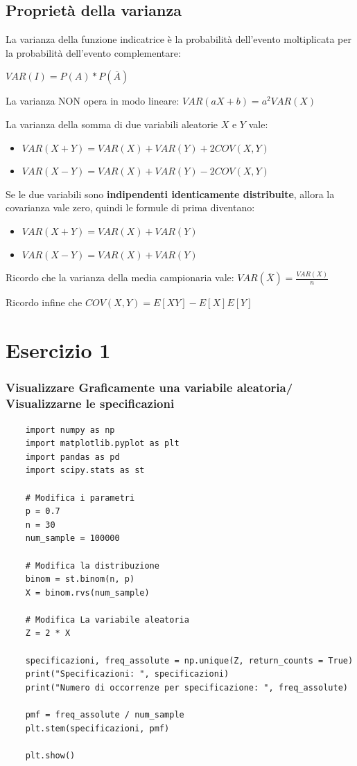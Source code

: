 \documentclass{article}
\begin{document}
\subsection*{Proprietà della varianza}

La varianza della funzione indicatrice è la probabilità dell'evento moltiplicata per la probabilità dell'evento complementare:

$VAR(I) = P(A) * P(\overline{A})$

La varianza NON opera in modo lineare: $VAR(aX + b) = a^2 VAR(X)$

La varianza della somma di due variabili aleatorie $X$ e $Y$ vale:

\begin{itemize}
    \item $VAR(X + Y) = VAR(X) + VAR(Y) + 2COV(X,Y)$
    \item $VAR(X - Y) = VAR(X) + VAR(Y) - 2COV(X,Y)$
\end{itemize}

Se le due variabili sono \textbf{indipendenti identicamente distribuite}, allora la covarianza vale zero, quindi le formule di prima diventano:

\begin{itemize}
    \item $VAR(X + Y) = VAR(X) + VAR(Y)$
    \item $VAR(X - Y) = VAR(X) + VAR(Y)$
\end{itemize}

Ricordo che la varianza della media campionaria vale: $VAR(\overline{X}) = \frac{VAR(X)}{n}$

Ricordo infine che $COV(X, Y) = E[XY] - E[X]E[Y]$

\pagebreak

\section{Esercizio 1}

\subsubsection*{Visualizzare Graficamente una variabile aleatoria/ Visualizzarne le specificazioni}

\begin{lstlisting}
    import numpy as np
    import matplotlib.pyplot as plt
    import pandas as pd
    import scipy.stats as st

    # Modifica i parametri
    p = 0.7
    n = 30
    num_sample = 100000

    # Modifica la distribuzione
    binom = st.binom(n, p)
    X = binom.rvs(num_sample)

    # Modifica La variabile aleatoria
    Z = 2 * X

    specificazioni, freq_assolute = np.unique(Z, return_counts = True)
    print("Specificazioni: ", specificazioni)
    print("Numero di occorrenze per specificazione: ", freq_assolute)

    pmf = freq_assolute / num_sample
    plt.stem(specificazioni, pmf)

    plt.show()
\end{lstlisting}
\end{document}
